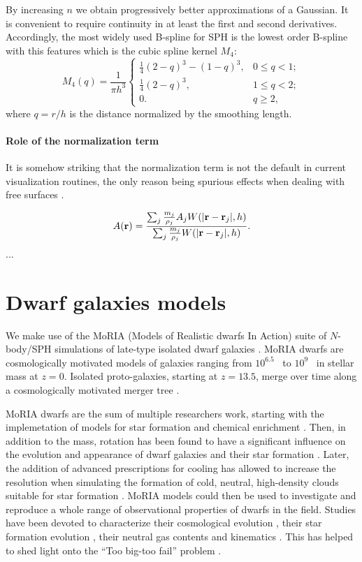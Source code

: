 By increasing $n$ we obtain progressively better approximations of a Gaussian.
It is convenient to require continuity in at least the first and second derivatives.
Accordingly, the most widely used B-spline for SPH is the lowest order B-spline with this features which is the cubic spline kernel $M_4$:
\begin{equation}
M_4(q) = \frac{1}{\pi h^3} \left\{
\begin{array}{ll}
\frac{1}{4}(2-q)^3 - (1 - q)^{3}, & 0 \le q < 1; \\
\frac{1}{4}(2-q)^3, & 1 \le q < 2; \\
0. & q \ge 2,
\end{array}
\right.
\label{eq:cubicspline}
\end{equation}
where $q=r/h$ is the distance normalized by the smoothing length.

\paragraph{Role of the normalization term}
It is somehow striking that the normalization term is not the default in current visualization routines, the only reason being spurious effects when dealing with free surfaces \citep{Price2007}.

\begin{equation}
 A(\boldsymbol{\mathbf{r}}) = \dfrac{\sum_j \frac{m_j}{\rho_j} A_j W(|\boldsymbol{\mathbf{r}} - \boldsymbol{\mathbf{r}}_j|,h)}{\sum_j \frac{m_j}{\rho_j} W(|\boldsymbol{\mathbf{r}} - \boldsymbol{\mathbf{r}}_j|,h)}.
\end{equation}
...

\section{Dwarf galaxies models}
We make use of the MoRIA (Models of Realistic dwarfs In Action) suite of $N$-body/SPH simulations of late-type isolated dwarf galaxies \citep{Verbeke2017}.
MoRIA dwarfs are cosmologically motivated models of galaxies ranging from $10^{6.5}$~\Msun{} to $10^9$~\Msun{} in stellar mass at $z=0$.
Isolated proto-galaxies, starting at $z = 13.5$, merge over time along a cosmologically motivated merger tree \citep{Cloet-Osselaer2014}.

MoRIA dwarfs are the sum of multiple researchers work, starting with the implemetation of models for star formation and chemical enrichment \citep{Valcke2008}. 
Then, in addition to the mass, rotation has been found to have a significant influence on the evolution and appearance of dwarf galaxies and their star formation \citep{Schroyen2011}.
Later, the addition of advanced prescriptions for cooling has allowed to increase the resolution when simulating the formation of cold, neutral, high-density clouds suitable for star formation \citep{DeRijcke2013}. %
MoRIA models could then be used to investigate and reproduce a whole range of observational properties of dwarfs in the field.
Studies have been devoted to characterize their cosmological evolution \citep{Cloet-Osselaer2012}, their star formation evolution \citep{Verbeke2015}, their neutral gas contents and kinematics \citep{Koleva2014}.
This has helped to shed light onto the ``Too big-too fail'' problem \citep{Verbeke2017}.


